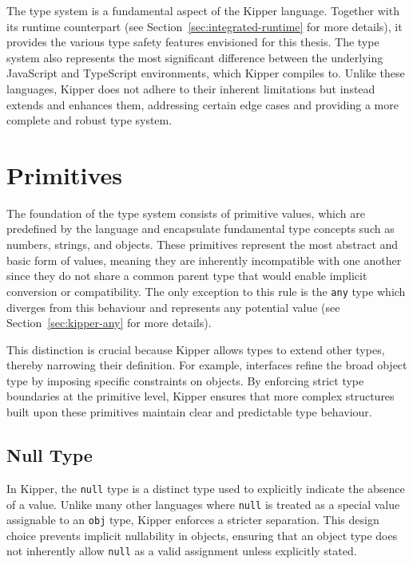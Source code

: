 
The type system is a fundamental aspect of the Kipper language. Together with its runtime counterpart (see Section~\ref{sec:integrated-runtime} for more details), it provides the various type safety features envisioned for this thesis. The type system also represents the most significant difference between the underlying JavaScript and TypeScript environments, which Kipper compiles to. Unlike these languages, Kipper does not adhere to their inherent limitations but instead extends and enhances them, addressing certain edge cases and providing a more complete and robust type system.

\section{Primitives}
\label{sec:kipper-primitives}

The foundation of the type system consists of primitive values, which are predefined by the language and encapsulate fundamental type concepts such as numbers, strings, and objects. These primitives represent the most abstract and basic form of values, meaning they are inherently incompatible with one another since they do not share a common parent type that would enable implicit conversion or compatibility. The only exception to this rule is the \lstinline|any| type which diverges from this behaviour and represents any potential value (see Section~\ref{sec:kipper-any} for more details).

This distinction is crucial because Kipper allows types to extend other types, thereby narrowing their definition. For example, interfaces refine the broad object type by imposing specific constraints on objects. By enforcing strict type boundaries at the primitive level, Kipper ensures that more complex structures built upon these primitives maintain clear and predictable type behaviour.

\subsection{Null Type}

In Kipper, the \lstinline|null| type is a distinct type used to explicitly indicate the absence of a value. Unlike many other languages where \lstinline|null| is treated as a special value assignable to an \lstinline|obj| type, Kipper enforces a stricter separation. This design choice prevents implicit nullability in objects, ensuring that an object type does not inherently allow \lstinline|null| as a valid assignment unless explicitly stated.

